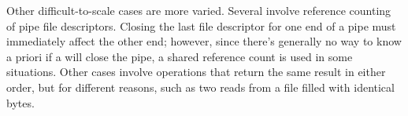 Other difficult-to-scale cases are more varied.  Several involve
reference counting of pipe file descriptors.  Closing the last file
descriptor for one end of a pipe must immediately affect the other
end; however, since there's generally no way to know a priori if a
 will close the pipe, a shared reference count is used in
some situations.  Other cases involve operations that return the same
result in either order, but for different reasons, such as two reads
from a file filled with identical bytes.


